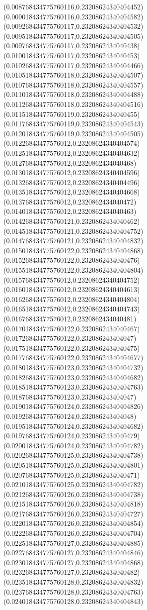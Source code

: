 {(0.008768434775760116,0.23208624340404452)
(0.009018434775760116,0.23208624340404582)
(0.009268434775760117,0.23208624340404532)
(0.009518434775760117,0.23208624340404505)
(0.009768434775760117,0.2320862434040438)
(0.010018434775760117,0.2320862434040453)
(0.010268434775760117,0.23208624340404466)
(0.010518434775760118,0.23208624340404507)
(0.010768434775760118,0.23208624340404557)
(0.011018434775760118,0.23208624340404488)
(0.011268434775760118,0.23208624340404516)
(0.011518434775760119,0.2320862434040455)
(0.011768434775760119,0.23208624340404543)
(0.012018434775760119,0.23208624340404505)
(0.01226843477576012,0.23208624340404574)
(0.01251843477576012,0.23208624340404632)
(0.01276843477576012,0.2320862434040468)
(0.01301843477576012,0.23208624340404596)
(0.01326843477576012,0.23208624340404496)
(0.01351843477576012,0.23208624340404668)
(0.01376843477576012,0.2320862434040472)
(0.01401843477576012,0.2320862434040463)
(0.014268434775760121,0.2320862434040462)
(0.014518434775760121,0.23208624340404752)
(0.014768434775760121,0.23208624340404832)
(0.015018434775760122,0.23208624340404868)
(0.015268434775760122,0.2320862434040476)
(0.015518434775760122,0.23208624340404804)
(0.01576843477576012,0.23208624340404752)
(0.01601843477576012,0.23208624340404613)
(0.01626843477576012,0.23208624340404804)
(0.01651843477576012,0.23208624340404743)
(0.01676843477576012,0.2320862434040481)
(0.017018434775760122,0.2320862434040467)
(0.017268434775760122,0.232086243404047)
(0.017518434775760122,0.2320862434040475)
(0.017768434775760122,0.23208624340404677)
(0.018018434775760123,0.23208624340404732)
(0.018268434775760123,0.23208624340404682)
(0.018518434775760123,0.23208624340404763)
(0.018768434775760123,0.232086243404047)
(0.019018434775760124,0.23208624340404826)
(0.019268434775760124,0.232086243404048)
(0.019518434775760124,0.23208624340404682)
(0.019768434775760124,0.2320862434040479)
(0.020018434775760124,0.23208624340404782)
(0.020268434775760125,0.23208624340404738)
(0.020518434775760125,0.23208624340404801)
(0.020768434775760125,0.2320862434040471)
(0.021018434775760125,0.23208624340404782)
(0.021268434775760126,0.23208624340404738)
(0.021518434775760126,0.23208624340404818)
(0.021768434775760126,0.23208624340404727)
(0.022018434775760126,0.23208624340404854)
(0.022268434775760126,0.23208624340404704)
(0.022518434775760127,0.23208624340404885)
(0.022768434775760127,0.23208624340404846)
(0.023018434775760127,0.23208624340404868)
(0.023268434775760127,0.2320862434040482)
(0.023518434775760128,0.23208624340404832)
(0.023768434775760128,0.23208624340404763)
(0.024018434775760128,0.23208624340404843)
}
